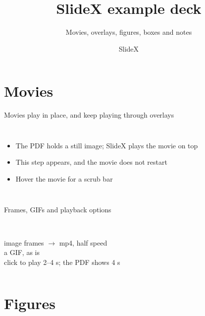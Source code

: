 \documentclass[aspectratio=169]{beamer}
\title{SlideX example deck}
\subtitle{Movies, overlays, figures, boxes and notes}
\author{SlideX}
\date{}
\begin{document}
\begin{frame}[label=title]
	\titlepage
\end{frame}

\section{Movies}

\begin{frame}[label=movie]{Movies play in place, and keep playing through overlays}
	\begin{columns}[c]
		\begin{itemize}
			\item<1-> The PDF holds a still image; SlideX plays the movie on top
			\item<2-> This step appears, and the movie does not restart
			\item<3-> Hover the movie for a scrub bar
		\end{itemize}
	\end{columns}
\end{frame}

\begin{frame}[label=options]{Frames, GIFs and playback options}
	\begin{columns}[T]
		\centering
		\\[1mm]
		{\small image frames $\to$ mp4, half speed}
		\centering
		\\[1mm]
		{\small a GIF, as is}
		\centering
		\\[1mm]
		{\small click to play 2--4 s; the PDF shows 4 s}
	\end{columns}
\end{frame}

\section{Figures}
\end{document}
